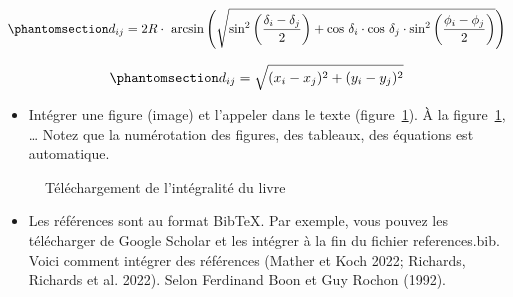 \documentclass[
  letterpaper,
  DIV=11,
  numbers=noendperiod]{scrreprt}
\providecommand{\tightlist}{%
  \setlength{\itemsep}{0pt}\setlength{\parskip}{0pt}}\usepackage{longtable,booktabs,array}
\begin{document}
\begin{equation}\phantomsection\label{eq-DistLongLat}{
 d_{ij} = 2R \cdot \text{ arcsin} \left( \sqrt{\text{sin}^2 \left( \frac{\delta _i - \delta _j}{2} \right) + \text{cos }\delta _i \cdot \text{cos }\delta _j \cdot \text{sin}^2 \left( \frac{\phi _i - \phi _j}{2} \right)} \right)
}\end{equation}

\begin{equation}\phantomsection\label{eq-DistEuc}{
 d_{ij} = \sqrt{(x_i-x_j)^2+(y_i-y_j)^2}
}\end{equation}

\begin{itemize}
\tightlist
\item
  Intégrer une figure (image) et l'appeler dans le texte
  (figure~\ref{fig-downloaffromgit}). À la
  figure~\ref{fig-downloaffromgit}, \ldots{} Notez que la numérotation
  des figures, des tableaux, des équations est automatique.
\end{itemize}

\begin{figure}


\caption{\label{fig-downloaffromgit}Téléchargement de l'intégralité du
livre}

\end{figure}%

\begin{itemize}
\tightlist
\item
  Les références sont au format BibTeX. Par exemple, vous pouvez les
  télécharger de Google Scholar et les intégrer à la fin du fichier
  references.bib. Voici comment intégrer des références (Mather et Koch
  2022; Richards, Richards et al. 2022). Selon Ferdinand Boon et Guy
  Rochon (1992).
\end{itemize}
\end{document}
